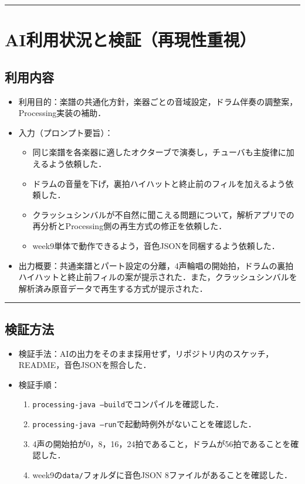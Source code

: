 \documentclass[uplatex,dvipdfmx,a4paper,11pt]{jsarticle}
\newcommand{\sectionrule}{\par\medskip\noindent\rule{\linewidth}{0.6pt}\par\medskip}
\begin{document}
\sectionrule

\section{AI利用状況と検証（再現性重視）}

\subsection{利用内容}

\begin{itemize}
  \item 利用目的：楽譜の共通化方針，楽器ごとの音域設定，ドラム伴奏の調整案，Processing実装の補助．
  \item 入力（プロンプト要旨）：
    \begin{itemize}
      \item {}同じ楽譜を各楽器に適したオクターブで演奏し，チューバも主旋律に加えるよう依頼した．
      \item {}ドラムの音量を下げ，裏拍ハイハットと終止前のフィルを加えるよう依頼した．
      \item {}クラッシュシンバルが不自然に聞こえる問題について，解析アプリでの再分析とProcessing側の再生方式の修正を依頼した．
      \item {}week9単体で動作できるよう，音色JSONを同梱するよう依頼した．
    \end{itemize}
  \item 出力概要：共通楽譜とパート設定の分離，4声輪唱の開始拍，ドラムの裏拍ハイハットと終止前フィルの案が提示された．また，クラッシュシンバルを解析済み原音データで再生する方式が提示された．
\end{itemize}

\sectionrule

\subsection{検証方法}

\begin{itemize}
  \item 検証手法：AIの出力をそのまま採用せず，リポジトリ内のスケッチ，README，音色JSONを照合した．
  \item 検証手順：
    \begin{enumerate}
      \item {}\texttt{processing-java --build}でコンパイルを確認した．
      \item {}\texttt{processing-java --run}で起動時例外がないことを確認した．
      \item {}4声の開始拍が0，8，16，24拍であること，ドラムが56拍であることを確認した．
      \item {}week9の\texttt{data/}フォルダに音色JSON 8ファイルがあることを確認した．
    \end{enumerate}
\end{itemize}
\end{document}
